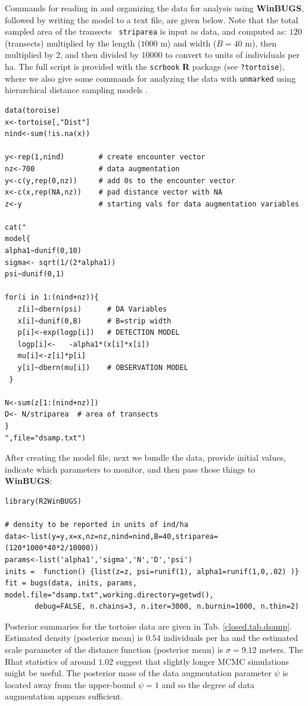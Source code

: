 Commands for reading in and organizing the data for analysis using {\bf
  WinBUGS}, followed by writing the model to a text file, are given
below. Note that the total sampled area of the transects \mbox{\tt
  striparea} is input as data, and computed as: $120$ (transects)
multiplied by the length ($1000$ m) and width ($B=40$ m), then
multiplied by 2, and then divided by $10000$ to convert to
units of individuals per ha. The full script is provided with the
\mbox{\tt scrbook} {\bf R} package (see \mbox{\tt ?tortoise}), where  we also give some commands for
analyzing the data with \mbox{\tt unmarked}
\citep{fiske_chandler:2011} using hierarchical distance sampling
models \citep{royle_etal:2004}.  
{\small
\begin{verbatim}
data(toroise)
x<-tortoise[,"Dist"]
nind<-sum(!is.na(x))

y<-rep(1,nind)        # create encounter vector
nz<-700               # data augmentation
y<-c(y,rep(0,nz))     # add 0s to the encounter vector
x<-c(x,rep(NA,nz))    # pad distance vector with NA
z<-y                  # starting vals for data augmentation variables

cat("
model{
alpha1~dunif(0,10)
sigma<- sqrt(1/(2*alpha1))
psi~dunif(0,1)

for(i in 1:(nind+nz)){
   z[i]~dbern(psi)      # DA Variables
   x[i]~dunif(0,B)      # B=strip width
   p[i]<-exp(logp[i])   # DETECTION MODEL
   logp[i]<-   -alpha1*(x[i]*x[i])
   mu[i]<-z[i]*p[i]
   y[i]~dbern(mu[i])    # OBSERVATION MODEL
 }

N<-sum(z[1:(nind+nz)])
D<- N/striparea  # area of transects
}
",file="dsamp.txt")
\end{verbatim}
}
After creating the model file, next 
we bundle the data,
provide initial values, indicate which parameters to monitor, and then
pass those things to {\bf WinBUGS}:
{\small
\begin{verbatim}
library(R2WinBUGS)

# density to be reported in units of ind/ha
data<-list(y=y,x=x,nz=nz,nind=nind,B=40,striparea=(120*1000*40*2/10000))
params<-list('alpha1','sigma','N','D','psi')
inits =  function() {list(z=z, psi=runif(1), alpha1=runif(1,0,.02) )}
fit = bugs(data, inits, params, model.file="dsamp.txt",working.directory=getwd(),
       debug=FALSE, n.chains=3, n.iter=3000, n.burnin=1000, n.thin=2)
\end{verbatim}
}
Posterior summaries for the tortoise data are given in Tab. \ref{closed.tab.dsamp}.
Estimated density (posterior mean) is $0.54$ individuals 
  per ha and the estimated scale parameter of the distance function
(posterior mean) is $\sigma=9.12$ meters.  The Rhat statistics of
around $1.02$ suggest that slightly longer MCMC simulations might be
useful. The posterior mass of the data augmentation parameter $\psi$
is located away from the upper-bound $\psi=1$ and so the degree of
data augmentation appears sufficient.

